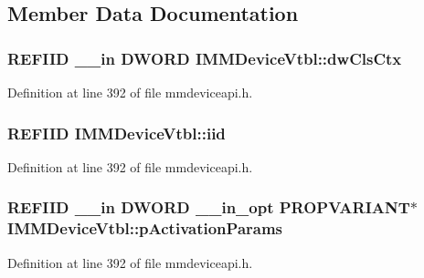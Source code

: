 \subsection{Member Data Documentation}
\subsubsection[{\texorpdfstring{dw\+Cls\+Ctx}{dwClsCtx}}]{ {\bf R\+E\+F\+I\+ID} {\bf \+\_\+\+\_\+in} {\bf D\+W\+O\+RD} I\+M\+M\+Device\+Vtbl\+::dw\+Cls\+Ctx}\hypertarget{struct_i_m_m_device_vtbl_aab61606af876c92134df0c5bf744cf6c}{}\label{struct_i_m_m_device_vtbl_aab61606af876c92134df0c5bf744cf6c}


Definition at line 392 of file mmdeviceapi.\+h.

\subsubsection[{\texorpdfstring{iid}{iid}}]{ {\bf R\+E\+F\+I\+ID} I\+M\+M\+Device\+Vtbl\+::iid}\hypertarget{struct_i_m_m_device_vtbl_a42c7e7f04789467eff9b233961aff297}{}\label{struct_i_m_m_device_vtbl_a42c7e7f04789467eff9b233961aff297}


Definition at line 392 of file mmdeviceapi.\+h.

\subsubsection[{\texorpdfstring{p\+Activation\+Params}{pActivationParams}}]{ {\bf R\+E\+F\+I\+ID} {\bf \+\_\+\+\_\+in} {\bf D\+W\+O\+RD} {\bf \+\_\+\+\_\+in\+\_\+opt} {\bf P\+R\+O\+P\+V\+A\+R\+I\+A\+NT}$\ast$ I\+M\+M\+Device\+Vtbl\+::p\+Activation\+Params}\hypertarget{struct_i_m_m_device_vtbl_a3619d9ea44a532a61cbef9cfd2dacd6a}{}\label{struct_i_m_m_device_vtbl_a3619d9ea44a532a61cbef9cfd2dacd6a}


Definition at line 392 of file mmdeviceapi.\+h.

